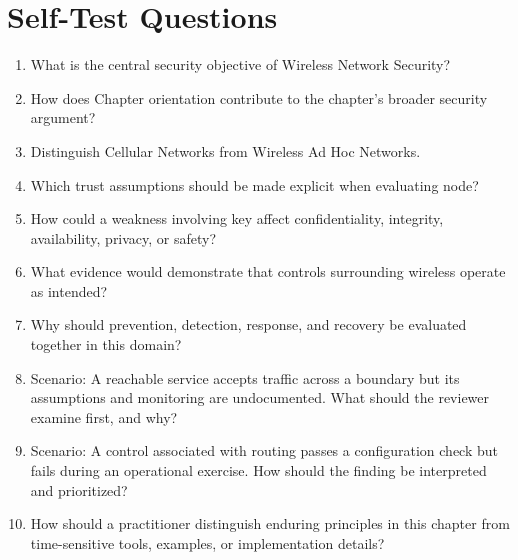 \documentclass[11pt]{article}
\begin{document}
\section*{Self-Test Questions}
\begin{enumerate}
\item What is the central security objective of Wireless Network Security?
\item How does Chapter orientation contribute to the chapter's broader security argument?
\item Distinguish Cellular Networks from Wireless Ad Hoc Networks.
\item Which trust assumptions should be made explicit when evaluating node?
\item How could a weakness involving key affect confidentiality, integrity, availability, privacy, or safety?
\item What evidence would demonstrate that controls surrounding wireless operate as intended?
\item Why should prevention, detection, response, and recovery be evaluated together in this domain?
\item Scenario: A reachable service accepts traffic across a boundary but its assumptions and monitoring are undocumented. What should the reviewer examine first, and why?
\item Scenario: A control associated with routing passes a configuration check but fails during an operational exercise. How should the finding be interpreted and prioritized?
\item How should a practitioner distinguish enduring principles in this chapter from time-sensitive tools, examples, or implementation details?
\end{enumerate}
\end{document}
